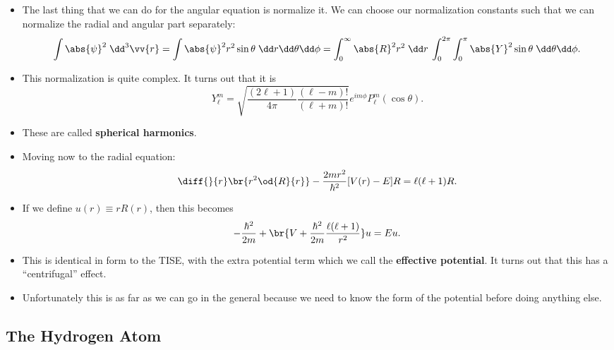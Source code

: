 \begin{itemize}
    \item The last thing that we can do for the angular equation is normalize it. We can choose our normalization constants such that we can normalize the radial and angular part separately:
        \begin{equation*}
            \int \abs{\psi}^2\;\dd^3\vv{r} = \int \abs{\psi}^2 r^2\sin\theta \;\dd r\dd\theta\dd\phi = \int_0^{\infty}\abs{R}^2r^2 \;\dd r \:\int_0^{2\pi}\int_0^{\pi}\abs{Y}^2 \sin\theta \;\dd\theta\dd\phi.
        \end{equation*}
    \item This normalization is quite complex. It turns out that it is
        \begin{equation}
            \boxed{Y_{\ell}^m = \sqrt{\frac{(2\ell + 1)}{4\pi}\frac{(\ell - m)!}{(\ell + m)!}} e^{im\phi} P_{\ell}^m(\cos\theta).}
        \end{equation}
    \item These are called \textbf{spherical harmonics}.
\end{itemize}



\begin{itemize}
    \item Moving now to the radial equation:
        \begin{equation}
            \diff{}{r}\br{r^2 \od{R}{r}} - \frac{2mr^2}{\hbar^2} [V(r) - E]R = \ell(\ell + 1)R.
        \end{equation}
    \item If we define $u(r) \equiv rR(r)$, then this becomes
        \begin{equation}
            -\frac{\hbar^2}{2m} + \br{V + \frac{\hbar^2}{2m} \frac{\ell(\ell + 1)}{r^2}}u = Eu.
        \end{equation}
    \item This is identical in form to the TISE, with the extra potential term which we call the \textbf{effective potential}. It turns out that this has a ``centrifugal'' effect.
    \item Unfortunately this is as far as we can go in the general because we need to know the form of the potential before doing anything else.
\end{itemize}




\subsection*{The Hydrogen Atom}

